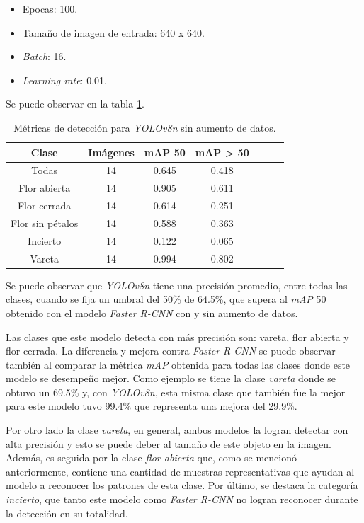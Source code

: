 \begin{itemize}
	\item Epocas: 100.
    \item Tamaño de imagen de entrada: 640 x 640.
    \item \textit{Batch}: 16.
    \item \textit{Learning rate}: 0.01.
\end{itemize}

Se puede observar en la tabla \ref{tab:resultadosYoloSinAug}.

\begin{table}[h]
	\centering
	\caption{Métricas de detección para \textit{YOLOv8n} sin aumento de datos.}
	\begin{tabular}{c c c c c c c}    
		\toprule
		\textbf{Clase}&\textbf{Imágenes}&\textbf{mAP 50}&\textbf{mAP > 50}\\
		\midrule
		Todas & 14 & 0.645 & 0.418\\
		Flor abierta & 14 & 0.905 & 0.611 \\
		Flor cerrada & 14 & 0.614 & 0.251 \\
		Flor sin pétalos & 14 & 0.588 & 0.363 \\
		Incierto & 14 & 0.122 & 0.065 \\
		Vareta & 14 & 0.994 & 0.802 \\		
		\bottomrule
		\hline
	\end{tabular}
	\label{tab:resultadosYoloSinAug}
\end{table}

Se puede observar que \textit{YOLOv8n} tiene una precisión promedio, entre todas las clases, cuando se fija un umbral del 50\% de 64.5\%, que supera al \textit{mAP} 50 obtenido con el modelo \textit{Faster R-CNN} con y sin aumento de datos.

Las clases que este modelo detecta con más precisión son: vareta, flor abierta y flor cerrada. La diferencia y mejora contra \textit{Faster R-CNN} se puede observar también al comparar la métrica \textit{mAP} obtenida para todas las clases donde este modelo se desempeño mejor. Como ejemplo se tiene la clase \textit{vareta} donde se obtuvo un 69.5\% y, con \textit{YOLOv8n}, esta misma clase que también fue la mejor para este modelo tuvo 99.4\% que representa una mejora del 29.9\%.

Por otro lado la clase \textit{vareta}, en general, ambos modelos la logran detectar con alta precisión y esto se puede deber al tamaño de este objeto en la imagen. Además, es seguida por la clase \textit{flor abierta} que, como se mencionó anteriormente, contiene una cantidad de muestras representativas que ayudan al modelo a reconocer los patrones de esta clase. Por último, se destaca la categoría \textit{incierto}, que tanto este modelo como \textit{Faster R-CNN} no logran reconocer durante la detección en su totalidad.

